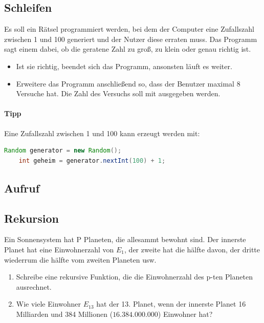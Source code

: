 \documentclass[11pt, a4paper]{article}
\newif\ifshowsolution
\begin{document}
\ifshowsolution
	
\fi

\subsection{Schleifen}
Es soll ein Rätsel programmiert werden, bei dem der Computer eine Zufallszahl zwischen 1 und 100 generiert und der Nutzer diese erraten muss. Das Programm sagt einem dabei, ob die geratene Zahl zu groß, zu klein oder genau richtig ist.
\begin{itemize}
	\item Ist sie richtig, beendet sich das Programm, ansonsten läuft es weiter.
	\item Erweitere das Programm anschließend so, dass der Benutzer maximal 8 Versuche hat. Die Zahl des Versuchs soll mit ausgegeben werden.
\end{itemize}
\paragraph{Tipp} Eine Zufallszahl zwischen 1 und 100 kann erzeugt werden mit:
\begin{lstlisting}[language=Java]
	Random generator = new Random();
	int geheim = generator.nextInt(100) + 1;
\end{lstlisting}

\ifshowsolution
	

	
\fi

\subsection{Aufruf}

\subsection{Rekursion}
Ein Sonnensystem hat P Planeten, die allesammt bewohnt sind. Der innerste Planet hat eine Einwohnerzahl von $E_1$, der zweite hat die hälfte davon, der dritte wiederrum die hälfte vom zweiten Planeten usw.
\begin{enumerate}
	\item Schreibe eine rekursive Funktion, die die Einwohnerzahl des p-ten Planeten ausrechnet.
	\item Wie viele Einwohner $E_{13}$ hat der 13. Planet, wenn der innerste Planet 16 Milliarden und 384 Millionen ($16.384.000.000$) Einwohner hat?
\end{enumerate}
\end{document}
